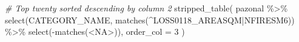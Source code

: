 \documentclass[10pt,landscape,a3paper]{article}
\newenvironment{Shaded}{\begin{snugshade}}{\end{snugshade}}
\newcommand{\AttributeTok}[1]{\textcolor[rgb]{0.77,0.63,0.00}{#1}}
\newcommand{\CommentTok}[1]{\textcolor[rgb]{0.56,0.35,0.01}{\textit{#1}}}
\newcommand{\DecValTok}[1]{\textcolor[rgb]{0.00,0.00,0.81}{#1}}
\newcommand{\FunctionTok}[1]{\textcolor[rgb]{0.00,0.00,0.00}{#1}}
\newcommand{\NormalTok}[1]{#1}
\newcommand{\SpecialCharTok}[1]{\textcolor[rgb]{0.00,0.00,0.00}{#1}}
\newcommand{\StringTok}[1]{\textcolor[rgb]{0.31,0.60,0.02}{#1}}
\begin{document}
\begin{Shaded}
\begin{Highlighting}[]
\CommentTok{\# Top twenty sorted descending by column 2}
\FunctionTok{stripped\_table}\NormalTok{(}
\NormalTok{  pazonal }\SpecialCharTok{\%\textgreater{}\%}
    \FunctionTok{select}\NormalTok{(CATEGORY\_NAME, }\FunctionTok{matches}\NormalTok{(}\StringTok{\textquotesingle{}\^{}LOSS0118\_AREASQM|NFIRESM6\textquotesingle{}}\NormalTok{)) }\SpecialCharTok{\%\textgreater{}\%}
    \FunctionTok{select}\NormalTok{(}\SpecialCharTok{{-}}\FunctionTok{matches}\NormalTok{(}\StringTok{\textquotesingle{}\textless{}NA\textgreater{}\textquotesingle{}}\NormalTok{)),}
  \AttributeTok{order\_col =} \DecValTok{3}
\NormalTok{)}
\end{Highlighting}
\end{Shaded}
\end{document}
